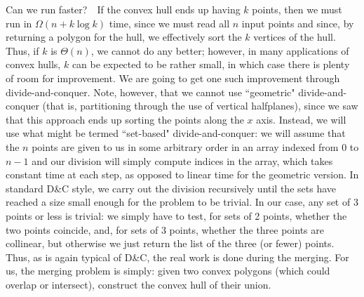 \documentclass[11pt]{article}
\begin{document}
Can we run faster?\ \ If the convex hull ends up having $k$ points, then
we must run in $\Omega(n+k\log k)$ time, since we must read all $n$
input points and since, by returning a polygon for the hull, we effectively
sort the $k$ vertices of the hull.  Thus, if $k$ is $\Theta(n)$, we cannot
do any better; however, in many applications of convex hulls, $k$ can be
expected to be rather small, in which case there is plenty of room for
improvement.  We are going to get one such improvement through
divide-and-conquer.  Note, however, that we cannot use ``geometric"
divide-and-conquer (that is, partitioning through the use of vertical
halfplanes), since we saw that this approach ends up sorting the points
along the $x$ axis.  Instead, we will use what might be termed ``set-based"
divide-and-conquer: we will assume that the $n$ points are given to us
in some arbitrary order in an array indexed from 0 to $n-1$ and our
division will simply compute indices in the array, which takes constant
time at each step, as opposed to linear time for the geometric version.
In standard D\&{}C style, we carry out the division recursively until
the sets have reached a size small enough for the problem to be trivial.
In our case, any set of 3 points or less is trivial: we simply have to
test, for sets of 2 points, whether the two points coincide, and, for sets
of 3 points, whether the three points are collinear, but otherwise
we just return the list of the three (or fewer) points.  Thus, as is again
typical of D\&{}C, the real work is done during the merging.  For us,
the merging problem is simply: given two convex polygons (which could overlap
or intersect), construct the convex hull of their union.
\end{document}
